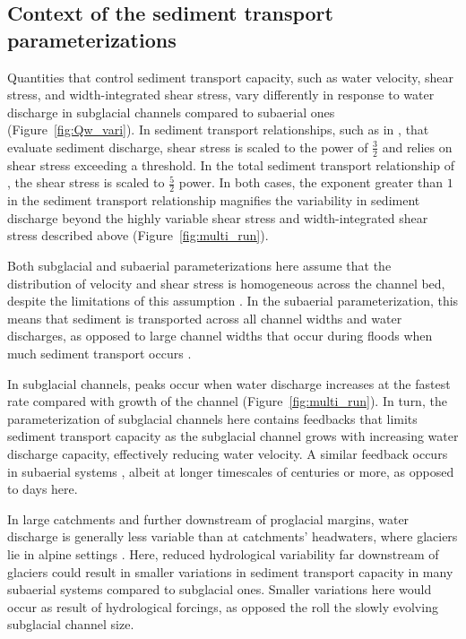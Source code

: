 \documentclass[11pt]{article}
\begin{document}
\subsection{Context of the sediment transport parameterizations}
Quantities that control sediment transport capacity, such as water velocity, shear stress, and width-integrated shear stress, vary differently in response to water discharge in subglacial channels compared to subaerial ones (Figure~\ref{fig:Qw_vari}).
In sediment transport relationships, such as in \citet{meyer1948}, that evaluate sediment discharge, shear stress is scaled to the power of $\frac{3}{2}$ and relies on shear stress exceeding a threshold.
In the total sediment transport relationship of \citet{engelund1967}, the shear stress is scaled to $\frac{5}{2}$ power.
In both cases, the exponent greater than $1$ in the sediment transport relationship magnifies the variability in sediment discharge beyond the highly variable shear stress and width-integrated shear stress described above (Figure~\ref{fig:multi_run}).

Both subglacial and subaerial parameterizations here assume that the distribution of velocity and shear stress is homogeneous across the channel bed, despite the limitations of this assumption \citep[e.g.][]{yager2018}.
In the subaerial parameterization, this means that sediment is transported across all channel widths and water discharges, as opposed to large channel widths that occur during floods when much sediment transport occurs \citep{wolman1960}.

In subglacial channels, peaks occur when water discharge increases at the fastest rate compared with growth of the channel (Figure~\ref{fig:multi_run}).
In turn, the parameterization of subglacial channels here contains feedbacks that limits sediment transport capacity as the subglacial channel grows with increasing water discharge capacity, effectively reducing water velocity.
A similar feedback occurs in subaerial systems \citep{phillips2016}, albeit at longer timescales of centuries or more, as opposed to days here.

In large catchments and further downstream of proglacial margins, water discharge is generally less variable than at catchments' headwaters, where glaciers lie in
alpine settings \citep[][]{swift2005,riihimaki2005,costa2017,vanas2017}.
Here, reduced hydrological variability far  downstream of glaciers could result in smaller variations in sediment transport capacity in many subaerial systems compared to subglacial ones.
Smaller variations here would occur as result of hydrological forcings, as opposed the roll the slowly evolving subglacial channel size.
\end{document}
